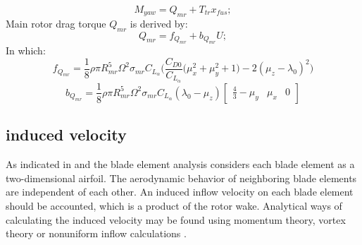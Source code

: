 \begin{equation}
	M_{yaw} = Q_{mr}+T_{tr}x_{fus};
\end{equation}
Main rotor drag torque $Q_{mr}$ is derived by:
\begin{equation}
	Q_{mr} = f_{Q_{mr}}+b_{Q_{mr}}U;
\end{equation}
In which:
\begin{equation} \label{f_Q}
	f_{Q_{mr}}=\frac{1}{8} \rho \pi R_{mr}^5 \Omega^2 \sigma_{mr} C_{L_{\alpha}}  \bigg( \frac{C_{D0}}{C_{L_{\alpha}}} \Big( \mu_x^2+\mu_y^2+1 \Big)-2(\mu_{z}-\lambda_0)^2 \bigg)
\end{equation}
\begin{equation} \label{b_Q}
	b_{Q_{mr}}=\frac{1}{8} \rho \pi R_{mr}^5 \Omega^2 \sigma_{mr} C_{L_{\alpha}} (\lambda_0-\mu_z)  \begin{bmatrix}
		\frac{4}{3}
		-\mu_y&
		\mu_x &
		0
	\end{bmatrix}  
\end{equation}

\subsection{induced velocity}

As indicated in \cite{johnson2012helicopter} and \cite{leishman2006principles} the blade element analysis considers each blade
element as a two-dimensional airfoil. The aerodynamic behavior of neighboring
blade elements are independent of each other. An induced inflow velocity on each
blade element should be accounted, which is a product of the rotor wake. Analytical
ways of calculating the induced velocity may be found using momentum theory,
vortex theory or nonuniform inflow calculations \cite{johnson2012helicopter}.\\

